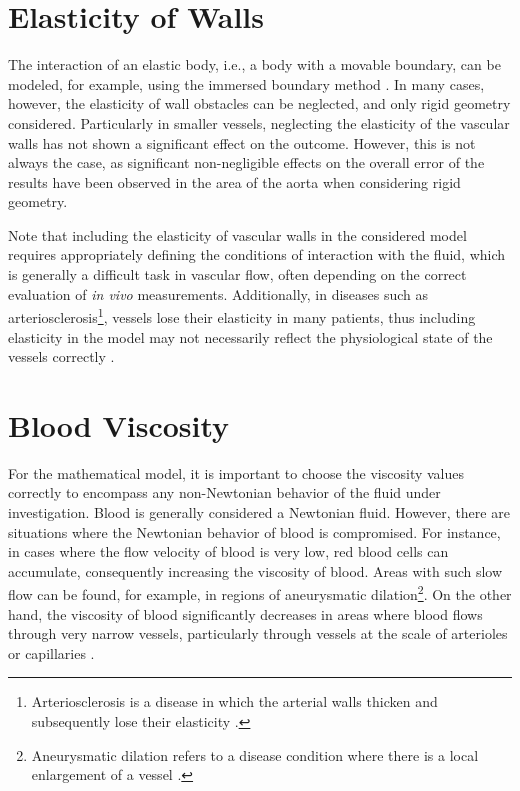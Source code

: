 \section*{\fontsize{11}{15}\selectfont Elasticity of Walls}
The interaction of an elastic body, i.e., a body with a movable boundary, can be modeled, for example, using the immersed boundary method \cite{Peskin}. In many cases, however, the elasticity of wall obstacles can be neglected, and only rigid geometry considered. Particularly in smaller vessels, neglecting the elasticity of the vascular walls has not shown a significant effect on the outcome. \cite{DempereMarco2006} However, this is not always the case, as significant non-negligible effects on the overall error of the results have been observed in the area of the aorta when considering rigid geometry. \cite{LANTZ2011}

Note that including the elasticity of vascular walls in the considered model requires appropriately defining the conditions of interaction with the fluid, which is generally a difficult task in vascular flow, often depending on the correct evaluation of \textit{in vivo} measurements. Additionally, in diseases such as arteriosclerosis\footnote{Arteriosclerosis is a disease in which the arterial walls thicken and subsequently lose their elasticity \cite{Fishbein2015}.}, vessels lose their elasticity in many patients, thus including elasticity in the model may not necessarily reflect the physiological state of the vessels correctly \cite{Saloner2019}.

\section*{\fontsize{11}{15}\selectfont Blood Viscosity}

For the mathematical model, it is important to choose the viscosity values correctly to encompass any non-Newtonian behavior of the fluid under investigation. Blood is generally considered a Newtonian fluid. However, there are situations where the Newtonian behavior of blood is compromised. For instance, in cases where the flow velocity of blood is very low, red blood cells can accumulate, consequently increasing the viscosity of blood.
Areas with such slow flow can be found, for example, in regions of aneurysmatic dilation\footnote{Aneurysmatic dilation refers to a disease condition where there is a local enlargement of a vessel \cite{Syed1997}.}. On the other hand, the viscosity of blood significantly decreases in areas where blood flows through very narrow vessels, particularly through vessels at the scale of arterioles or capillaries \cite{Saloner2019}.

